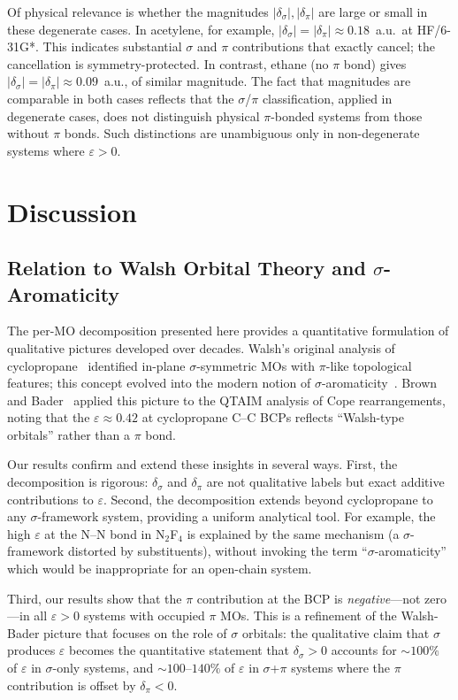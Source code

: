\documentclass[11pt,a4paper]{article}
\newcommand{\delsg}{\delta_{\sigma}}
\newcommand{\delpi}{\delta_{\pi}}
\newcommand{\eps}{\varepsilon}
\begin{document}
Of physical relevance is whether the magnitudes
$|\delsg|, |\delpi|$ are large or small in these degenerate cases.
In acetylene, for example, $|\delsg| = |\delpi| \approx 0.18$~a.u.\
at HF/6-31G*. This indicates substantial $\sigma$ and $\pi$ contributions
that exactly cancel; the cancellation is symmetry-protected. In
contrast, ethane (no $\pi$ bond) gives $|\delsg| = |\delpi| \approx 0.09$~a.u.,
of similar magnitude. The fact that magnitudes are comparable in
both cases reflects that the $\sigma$/$\pi$ classification, applied
in degenerate cases, does not distinguish physical $\pi$-bonded
systems from those without $\pi$ bonds. Such distinctions are
unambiguous only in non-degenerate systems where $\eps > 0$.

\section{Discussion}
\label{sec:discussion}

\subsection{Relation to Walsh Orbital Theory and $\sigma$-Aromaticity}

The per-MO decomposition presented here provides a quantitative
formulation of qualitative pictures developed over decades. Walsh's
original analysis of cyclopropane~\citep{Walsh1947} identified
in-plane $\sigma$-symmetric MOs with $\pi$-like topological
features; this concept evolved into the modern notion of
$\sigma$-aromaticity~\citep{Cremer1988,Dewar1984}. Brown and
Bader~\citep{Brown2009} applied this picture to the QTAIM analysis
of Cope rearrangements, noting that the $\eps \approx 0.42$ at
cyclopropane C--C BCPs reflects ``Walsh-type orbitals'' rather
than a $\pi$ bond.

Our results confirm and extend these insights in several ways.
First, the decomposition is rigorous: $\delsg$ and $\delpi$ are not
qualitative labels but exact additive contributions to $\eps$.
Second, the decomposition extends beyond cyclopropane to any
$\sigma$-framework system, providing a uniform analytical tool.
For example, the high $\eps$ at the N--N bond in N$_2$F$_4$ is
explained by the same mechanism (a $\sigma$-framework distorted by
substituents), without invoking the term ``$\sigma$-aromaticity''
which would be inappropriate for an open-chain system.

Third, our results show that the $\pi$ contribution at the BCP is
\emph{negative}---not zero---in all $\eps > 0$ systems with occupied
$\pi$ MOs. This is a refinement of the Walsh-Bader picture that
focuses on the role of $\sigma$ orbitals: the qualitative claim
that $\sigma$ produces $\eps$ becomes the quantitative statement that
$\delsg > 0$ accounts for $\sim 100\%$ of $\eps$ in
$\sigma$-only systems, and $\sim 100$--$140\%$ of $\eps$ in
$\sigma$+$\pi$ systems where the $\pi$ contribution is offset by
$\delpi < 0$.
\end{document}
